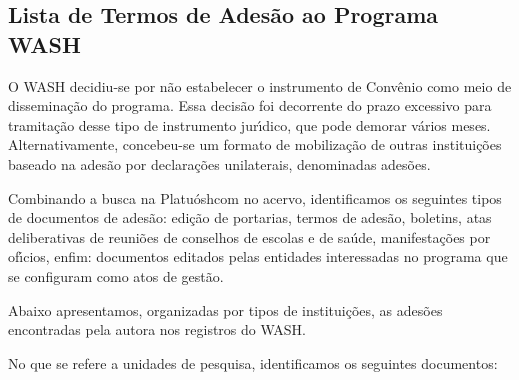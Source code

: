 \documentclass[
12pt,		%
openright,	%
twoside,  %
a4paper,			%
chapter=TITLE,		%
english,			%
french,				%
spanish,			%
brazil				%
]{USPSC-classe/USPSC}
\begin{document}
\subsection[Lista de Termos de Ades\~ao ao Programa WASH]{Lista de Termos de Ades\~ao ao Programa WASH}\label{Lista de Termos de Ades\~ao ao Programa WASH}
O WASH decidiu-se por n\~ao estabelecer  o instrumento de Conv\^enio como meio de dissemina\c{c}\~ao do programa. Essa decis\~ao foi decorrente do prazo excessivo para tramita\c{c}\~ao desse tipo de instrumento jur\'{\i}dico, que pode demorar v\'arios meses. Alternativamente, concebeu-se um formato de mobiliza\c{c}\~ao de outras institui\c{c}\~oes baseado na ades\~ao por declara\c{c}\~oes  unilaterais, denominadas \textquotedbl ades\~oes\textquotedbl .










Combinando a busca na \textquotedbl Platu\'osh\textquotedbl  com no acervo, identificamos os seguintes tipos de documentos de ades\~ao:  edi\c{c}\~ao de portarias, termos de ades\~ao, boletins, atas deliberativas de reuni\~oes de conselhos de escolas e de sa\'ude, manifesta\c{c}\~oes por of\'{\i}cios, enfim: documentos editados pelas entidades interessadas no programa que se configuram como atos de gest\~ao.










Abaixo apresentamos, organizadas por tipos de institui\c{c}\~oes, as ades\~oes encontradas pela autora nos registros do WASH.










No que se refere a \textquotedbl unidades de pesquisa\textquotedbl , identificamos os seguintes documentos:
\end{document}
